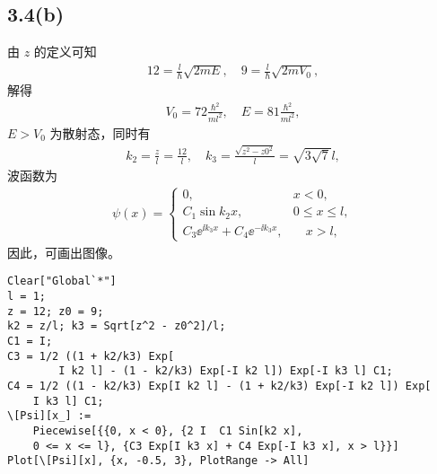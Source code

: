 \subsection{3.4(b)}
由 $z$ 的定义可知
\begin{align}
    12 = \frac{l}{\hbar} \sqrt{2mE}, \quad 9 = \frac {l}{\hbar} \sqrt{2mV_0},
\end{align}
解得
\begin{align}
    V_0 = 72 \frac{\hbar^2}{ml^2}, \quad E = 81 \frac{\hbar^2}{ml^2},
\end{align}
$E > V_0$ 为散射态，同时有
\begin{align}
    k_2 = \frac zl = \frac{12}l, \quad k_3 = \frac{\sqrt{z^2-z0^2}}l = \sqrt{3\sqrt7}l,
\end{align}
波函数为
\begin{align}
    \psi(x) = \begin{cases}
        0, \quad & x < 0, \\
        C_1 \sin k_2 x, \quad & 0 \leq x \leq l, \\
        C_3 \ee^{\ii k_3 x} + C_4 \ee^{-\ii k_3 x}, &\quad x > l,
    \end{cases}
\end{align}
因此，可画出图像。
\begin{lstlisting}
Clear["Global`*"]
l = 1;
z = 12; z0 = 9;
k2 = z/l; k3 = Sqrt[z^2 - z0^2]/l;
C1 = I;
C3 = 1/2 ((1 + k2/k3) Exp[
        I k2 l] - (1 - k2/k3) Exp[-I k2 l]) Exp[-I k3 l] C1;
C4 = 1/2 ((1 - k2/k3) Exp[I k2 l] - (1 + k2/k3) Exp[-I k2 l]) Exp[
    I k3 l] C1;
\[Psi][x_] := 
    Piecewise[{{0, x < 0}, {2 I  C1 Sin[k2 x], 
    0 <= x <= l}, {C3 Exp[I k3 x] + C4 Exp[-I k3 x], x > l}}]
Plot[\[Psi][x], {x, -0.5, 3}, PlotRange -> All]
\end{lstlisting}

